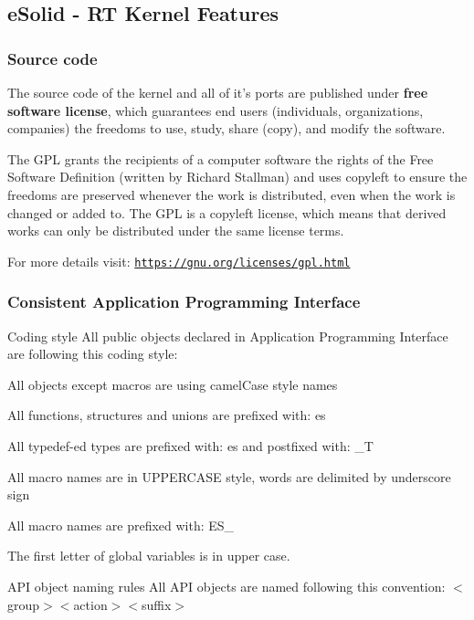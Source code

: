 \hypertarget{index_kernel_specs}{}\subsection{e\-Solid -\/ R\-T Kernel Features}\label{index_kernel_specs}
\hypertarget{index_spec_source}{}\subsubsection{Source code}\label{index_spec_source}
The source code of the kernel and all of it's ports are published under {\bfseries free software license}, which guarantees end users (individuals, organizations, companies) the freedoms to use, study, share (copy), and modify the software.

The G\-P\-L grants the recipients of a computer software the rights of the Free Software Definition (written by Richard Stallman) and uses copyleft to ensure the freedoms are preserved whenever the work is distributed, even when the work is changed or added to. The G\-P\-L is a copyleft license, which means that derived works can only be distributed under the same license terms.

For more details visit\-: \href{https://gnu.org/licenses/gpl.html}{\tt https\-://gnu.\-org/licenses/gpl.\-html}\hypertarget{index_spec_api}{}\subsubsection{Consistent Application Programming Interface}\label{index_spec_api}
\begin{DoxyParagraph}{Coding style}
All public objects declared in Application Programming Interface are following this coding style\-:
\begin{DoxyItemize}
\item All objects except macros are using {\ttfamily camel\-Case} style names
\item All functions, structures and unions are prefixed with\-: {\ttfamily es}
\item All typedef-\/ed types are prefixed with\-: {\ttfamily es} and postfixed with\-: {\ttfamily \-\_\-\-T}
\item All macro names are in {\ttfamily U\-P\-P\-E\-R\-C\-A\-S\-E} style, words are delimited by underscore sign
\item All macro names are prefixed with\-: {\ttfamily E\-S\-\_\-}
\item The first letter of global variables is in upper case.
\end{DoxyItemize}
\end{DoxyParagraph}
\begin{DoxyParagraph}{A\-P\-I object naming rules}
All A\-P\-I objects are named following this convention\-: {\ttfamily $<$group$>$$<$action$>$$<$suffix$>$}
\end{DoxyParagraph}

